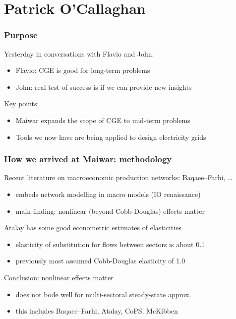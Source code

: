 \documentclass[handout,english]{beamer}
\begin{document}
\section{Patrick O'Callaghan}
\begin{frame}
  \frametitle{Purpose}
  Yesterday in conversations with Flavio and John:
  \begin{itemize}
    \item Flavio: CGE is good for long-term problems
    \item John: real test of success is if we can provide new insights
  \end{itemize}
  Key points:
  \begin{itemize}
    \item Maiwar expands the scope of CGE to mid-term problems
    \item Tools we now have are being applied to design electricity grids
\end{itemize}
\end{frame}
\begin{frame}
  \frametitle{How we arrived at Maiwar: methodology}
  Recent literature on macroeconomic production networks: Baqaee--Farhi, \dots
  \begin{itemize}
    \item embeds network modelling in macro models (IO renaissance)
    \item main finding: nonlinear (beyond Cobb-Douglas) effects matter
  \end{itemize}
  Atalay has some good econometric estimates of elasticities
  \begin{itemize}
    \item elasticity of substitution for flows between sectors is about 0.1
    \item previously most assumed Cobb-Douglas elasticity of 1.0
  \end{itemize}
  Conclusion: nonlinear effects matter
  \begin{itemize}
    \item {\color{patrickcolor3}
      does not bode well for multi-sectoral steady-state approx.}
    \item this includes Baqaee--Farhi, Atalay, CoPS, McKibben
  \end{itemize}
\end{frame}
\end{document}
